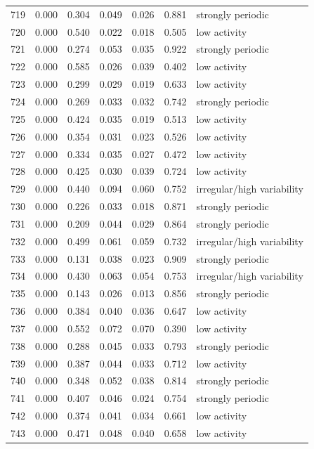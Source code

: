 \begin{longtable}{lrrrrrl}
719 & 0.000 & 0.304 & 0.049 & 0.026 & 0.881 & strongly periodic \\
720 & 0.000 & 0.540 & 0.022 & 0.018 & 0.505 & low activity \\
721 & 0.000 & 0.274 & 0.053 & 0.035 & 0.922 & strongly periodic \\
722 & 0.000 & 0.585 & 0.026 & 0.039 & 0.402 & low activity \\
723 & 0.000 & 0.299 & 0.029 & 0.019 & 0.633 & low activity \\
724 & 0.000 & 0.269 & 0.033 & 0.032 & 0.742 & strongly periodic \\
725 & 0.000 & 0.424 & 0.035 & 0.019 & 0.513 & low activity \\
726 & 0.000 & 0.354 & 0.031 & 0.023 & 0.526 & low activity \\
727 & 0.000 & 0.334 & 0.035 & 0.027 & 0.472 & low activity \\
728 & 0.000 & 0.425 & 0.030 & 0.039 & 0.724 & low activity \\
729 & 0.000 & 0.440 & 0.094 & 0.060 & 0.752 & irregular/high variability \\
730 & 0.000 & 0.226 & 0.033 & 0.018 & 0.871 & strongly periodic \\
731 & 0.000 & 0.209 & 0.044 & 0.029 & 0.864 & strongly periodic \\
732 & 0.000 & 0.499 & 0.061 & 0.059 & 0.732 & irregular/high variability \\
733 & 0.000 & 0.131 & 0.038 & 0.023 & 0.909 & strongly periodic \\
734 & 0.000 & 0.430 & 0.063 & 0.054 & 0.753 & irregular/high variability \\
735 & 0.000 & 0.143 & 0.026 & 0.013 & 0.856 & strongly periodic \\
736 & 0.000 & 0.384 & 0.040 & 0.036 & 0.647 & low activity \\
737 & 0.000 & 0.552 & 0.072 & 0.070 & 0.390 & low activity \\
738 & 0.000 & 0.288 & 0.045 & 0.033 & 0.793 & strongly periodic \\
739 & 0.000 & 0.387 & 0.044 & 0.033 & 0.712 & low activity \\
740 & 0.000 & 0.348 & 0.052 & 0.038 & 0.814 & strongly periodic \\
741 & 0.000 & 0.407 & 0.046 & 0.024 & 0.754 & strongly periodic \\
742 & 0.000 & 0.374 & 0.041 & 0.034 & 0.661 & low activity \\
743 & 0.000 & 0.471 & 0.048 & 0.040 & 0.658 & low activity \\

\end{longtable}
